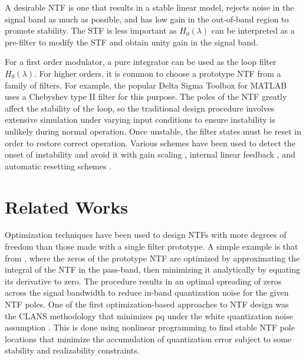 A desirable \gls{NTF} is one that results in a stable linear model, rejects noise in the signal band as much as possible, and has low gain in the out-of-band region to promote stability. The \gls{STF} is less important as $H_0(\lambda)$ can be interpreted as a pre-filter to modify the \gls{STF} and obtain unity gain in the signal band.

For a first order modulator, a pure integrator can be used as the loop filter $H_0(\lambda)$. For higher orders, it is common to choose a prototype \gls{NTF} from a family of filters. For example, the popular Delta Sigma Toolbox for MATLAB \cite[Appx. B]{Schreier1997} uses a Chebyshev type II filter for this purpose. The poles of the \gls{NTF} greatly affect the stability of the loop, so the traditional design procedure involves extensive simulation under varying input conditions to ensure instability is unlikely during normal operation. Once unstable, the filter states must be reset in order to restore correct operation. Various schemes have been used to detect the onset of instability \cite{Wong2004} and avoid it with gain scaling \cite{Sooch1989}, internal linear feedback \cite{Moussavi1994}, and automatic resetting schemes \cite{Eynde1991}.

\section{Related Works}
\label{sec:in-rw}

Optimization techniques have been used to design \gls{NTF}s with more degrees of freedom than those made with a single filter prototype. A simple example is that from \cite[Sec. 4.3]{Schreier1997}, where the zeros of the prototype \gls{NTF} are optimized by approximating the integral of the \gls{NTF} in the pass-band, then minimizing it analytically by equating its derivative to zero. The procedure results in an optimal spreading of zeros across the signal bandwidth to reduce in-band quantization noise for the given \gls{NTF} poles. One of the first optimization-based approaches to \gls{NTF} design was the \gls{CLANS} methodology that minimizes \gls{pq} under the white quantization noise assumption \cite{Kenney1988}. This is done using nonlinear programming to find stable \gls{NTF} pole locations that minimize the accumulation of quantization error subject to some stability and realizability constraints.

